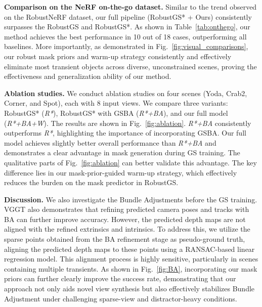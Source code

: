 \documentclass[letterpaper, 10 pt, conference]{ieeeconf}  %
\begin{document}
\noindent
\textbf{Comparison on the NeRF on-the-go dataset.} Similar to the trend observed on the RobustNeRF dataset, our full pipeline (RobustGS* + Ours) consistently surpasses the RobustGS and RobustGS*. As shown in Table~\ref{tab:onthego}, our method achieves the best performance in 10 out of 18 cases, outperforming all baselines.  More importantly, as demonstrated in Fig.~\ref{fig:visual_comparisons}, our robust mask priors and warm-up strategy consistently and effectively eliminate most transient objects across diverse, unconstrained scenes, proving the effectiveness and generalization ability of our method.






\noindent
\textbf{Ablation studies.} We conduct ablation studies on four scenes (Yoda, Crab2, Corner, and Spot), each with 8 input views. We compare three variants: RobustGS* (\textit{R*}), RobustGS* with GSBA (\textit{R*+BA}), and our full model (\textit{R*+BA+W}). The results are shown in Fig.~\ref{fig:ablation}. \textit{R*+BA} consistently outperforms \textit{R*}, highlighting the importance of incorporating GSBA. Our full model achieves slightly better overall performance than \textit{R*+BA} and demonstrates a clear advantage in mask generation during GS training. The qualitative parts of Fig.~\ref{fig:ablation} can better validate this advantage. The key difference lies in our mask-prior-guided warm-up strategy, which effectively reduces the burden on the mask predictor in RobustGS.

\noindent
\textbf{Discussion.} We also investigate the Bundle Adjustments before the GS training. VGGT also demonstrates that refining predicted camera poses and tracks with BA can further improve accuracy. However, the predicted depth maps are not aligned with the refined extrinsics and intrinsics.  To address this, we utilize the sparse points obtained from the BA refinement stage as pseudo-ground truth, aligning the predicted depth maps to these points using a RANSAC-based linear regression model. This alignment process is highly sensitive, particularly in scenes containing multiple transients. As shown in Fig.~\ref{fig:BA}, incorporating our mask priors can further clearly improve the success rate, demonstrating that our approach not only aids novel view synthesis but also effectively stabilizes Bundle Adjustment under challenging sparse-view and distractor-heavy conditions.
\end{document}
